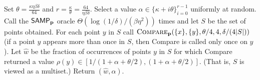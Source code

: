 \begin{algorithm}
\begin{algorithmic}[1]
\Require{\PCOND query access to a distribution
$\D$ over $[n]$,
a point $x \in [n]$ and parameters
$\kappa,\beta,\eta,\delta\in (0,1/2]$}
\State
Set
$\theta = \frac{\kappa\eta\beta\delta}{64}$
and $r = \frac{\kappa}{\theta}=\frac{64}{\eta\beta\delta}$.
\State Select a value $\alpha \in \{\kappa+ i\theta\}_{i=0}^{r -1}$
uniformly at random.
\State Call the ${\sf SAMP}_{\mathbf{p}}$ oracle $\Theta(\log(1/\delta)/(\beta\eta^2))$
times and let $S$ be the set of points obtained.
\State For each point $y$ in $S$ call
$\mbox{\sc Compare}_{\mathbf{p}}(\{x\},\{y\},\theta/4,4,\delta/(4|S|))$ (if a point
$y$ appears more than once in $S$, then {\sc Compare} is called only once
on $y$).
\State Let $\hat{w}$ be the fraction
of occurrences of points $y$ in $S$ for which
{\sc Compare} returned a value
$\rho(y) \in [1/(1+\alpha+\theta/2),(1+\alpha+\theta/2)]$.
(That is, $S$ is viewed as a multiset.)
\State
Return $(\hat{w},\alpha)$.
\end{algorithmic}\caption{\label{alg:est-n}{\sc Estimate-Neighborhood}}
\end{algorithm}

